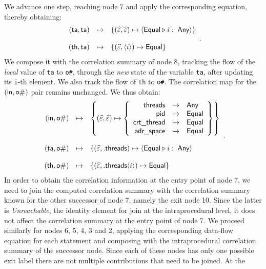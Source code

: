 \documentclass[11pt]{article}
\newcommand{\disp}[1]{\lstinline&#1&}
\begin{document}
We advance one step, reaching node 7 and apply the corresponding equation,
thereby obtaining:
\[
\begin{array}{rll}
(\textsf{ta}, \textsf{ta}) &\mapsto 
           &\left\{ (\widehat{\varepsilon}, \widehat{\varepsilon}) \mapsto \left\langle \textsf{Equal} \triangleright i: \; \textsf{Any} \right\rangle
            \right\} \\\\
(\textsf{th}, \textsf{ta}) & \mapsto &\{(\widehat{\varepsilon}, \langle i \rangle) \mapsto \textsf{Equal}\}
\end{array} .
\]
We compose it with the correlation summary of node 8, tracking the flow of the 
\emph{local} value of \disp{ta} to \disp{o#}, through the \emph{new} state of the 
variable \disp{ta}, after updating its \disp{i}-th element. We also track the flow
of \disp{th} to \disp{o#}. The correlation map for the $(\textsf{in},\textsf{o\#})$ pair remains 
unchanged. We thus obtain:
\[
\begin{array}{rll}
(\textsf{in}, \textsf{o\#}) &\mapsto 
           &\left\{ (\widehat{\varepsilon}, \widehat{\varepsilon}) \mapsto
           \left\{\begin{array}{rll}
           \textrm{\textsf{threads}} &\mapsto &\textsf{Any} \\
           \textrm{\textsf{pid}} &\mapsto &\textsf{Equal} \\
           \textrm{\textsf{crt\_thread}} &\mapsto &\textsf{Equal} \\
           \textrm{\textsf{adr\_space}} &\mapsto&\textsf{Equal}
           \end{array}\right\}\right\} \\\\
(\textsf{ta}, \textsf{o\#}) & \mapsto &\{(\widehat{\varepsilon}, .\textsf{threads}) \mapsto \left\langle \textsf{Equal} \triangleright i: \; \textsf{Any} \right\rangle\\\\
(\textsf{th}, \textsf{o\#}) & \mapsto &\{(\widehat{\varepsilon}, .\textsf{threads}\langle i \rangle) \mapsto \textsf{Equal}\}
\end{array}.
\]  
In order to obtain the correlation information at the entry point of node 7,
we need to join the computed correlation summary with the correlation summary
known for the other successor of node 7, namely the exit node 10. Since the 
latter is \emph{Unreachable}, the identity element for join at the intraprocedural 
level, it does not affect the correlation summary at the entry point of node 7.
We proceed similarly for nodes 6, 5, 4, 3 and 2, applying the corresponding data-flow 
equation for each statement and composing with the intraprocedural correlation 
summary of the successor node. Since each of these nodes has only one possible
exit label there are not multiple contributions that need to be joined. At the 
\end{document}
